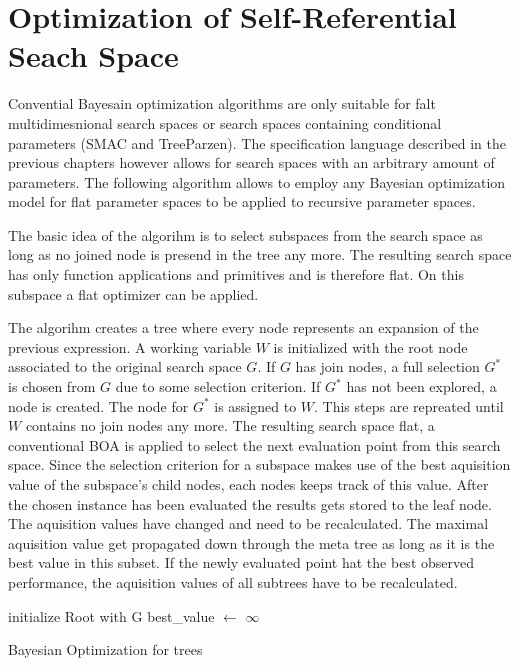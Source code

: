 \documentclass[english]{article}
\begin{document}
\section{Optimization of Self-Referential Seach Space}
Convential Bayesain optimization algorithms are only suitable for falt multidimesnional search spaces or search spaces containing conditional parameters (SMAC and TreeParzen). The specification language described in the previous chapters however allows for search spaces with an arbitrary amount of parameters. The following algorithm allows to employ any Bayesian optimization model for flat parameter spaces to be applied to recursive parameter spaces.

The basic idea of the algorihm is to select subspaces from the search space as long as no joined node is presend in the tree any more. The resulting search space has only function applications and primitives and is therefore flat. On this subspace a flat optimizer can be applied.

The algorihm creates a tree where every node represents an expansion of the previous expression. A working variable $W$ is initialized with the root node associated to the original search space $G$. If $G$ has join nodes, a full selection $G^*$ is chosen from $G$ due to some selection criterion. If $G^*$ has not been explored, a node is created. The node for $G^*$ is assigned to $W$. This steps are repreated until $W$ contains no join nodes any more. The resulting search space flat, a conventional \ac{BOA} is applied to select the next evaluation point from this search space. Since the selection criterion for a subspace makes use of the best aquisition value of the subspace's child nodes, each nodes keeps track of this value. After the chosen instance has been evaluated the results gets stored to the leaf node. The aquisition values have changed and need to be recalculated. The maximal aquisition value get propagated down through the meta tree as long as it is the best value in this subset. If the newly evaluated point hat the best observed performance, the aquisition values of all subtrees have to be recalculated.



\begin{algorithm}[H]
\SetAlgoLined
initialize Root with G\;
best\_value $\leftarrow$ $\infty$\;


\caption{Bayesian Optimization for trees}

\end{algorithm}
%
\end{document}
